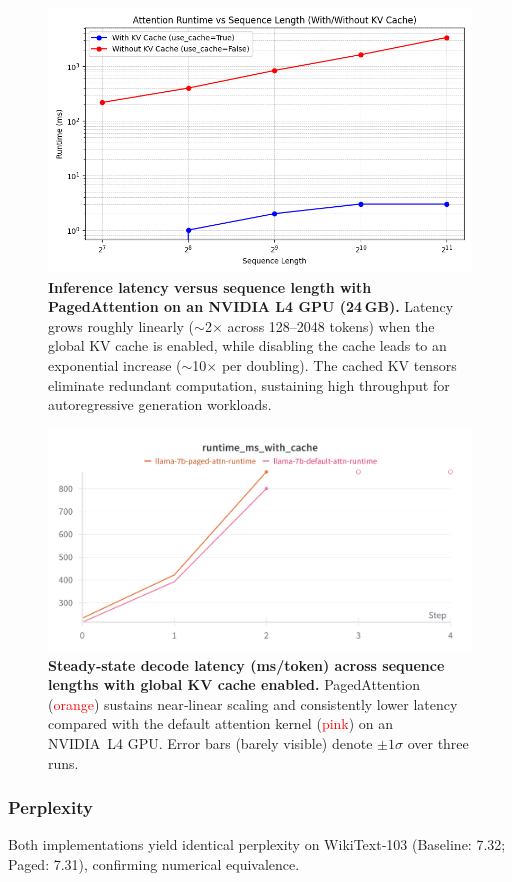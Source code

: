\documentclass[conference]{IEEEtran}
\begin{document}
\begin{figure}[t]
  \centering
  \includegraphics[width=0.8\linewidth]{images/attention_runtime_paged_plot.png}
  \caption{\textbf{Inference latency versus sequence length with PagedAttention on an NVIDIA L4 GPU (24 GB).} Latency grows roughly linearly ($\sim$2$\times$ across 128–2048 tokens) when the global KV cache is enabled, while disabling the cache leads to an exponential increase ($\sim$10$\times$ per doubling). The cached KV tensors eliminate redundant computation, sustaining high throughput for autoregressive generation workloads.}
  \label{fig:runtime_paged_l4}
\end{figure}

\begin{figure}[t]
  \centering
  \includegraphics[width=0.8\linewidth]{images/wandb_runtime_ms_with_cache.png}
  \caption{\textbf{Steady‑state decode latency (ms/token) across sequence lengths with global KV cache enabled.}  PagedAttention (\textcolor{red}{orange}) sustains near‑linear scaling and consistently lower latency compared with the default attention kernel (\textcolor{red}{pink}) on an NVIDIA L4 GPU.  Error bars (barely visible) denote $\pm1\sigma$ over three runs.}
  \label{fig:wb_latency}
\end{figure}

\subsubsection{Perplexity}
Both implementations yield identical perplexity on WikiText‑103 (Baseline: 7.32; Paged: 7.31), confirming numerical equivalence.
\end{document}

